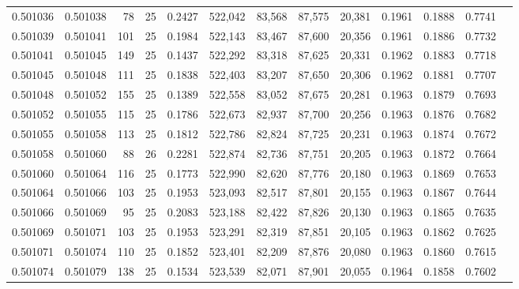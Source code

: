 \begin{tabular}{rrrrrrrrrrrrr}
0.501036 & 0.501038 &  78 &  25 &                                     0.2427 & 522,042 &  83,568 &  87,575 &  20,381 & 0.1961 & 0.1888 & 0.7741 \\
0.501039 & 0.501041 & 101 &  25 &                                     0.1984 & 522,143 &  83,467 &  87,600 &  20,356 & 0.1961 & 0.1886 & 0.7732 \\
0.501041 & 0.501045 & 149 &  25 &                                     0.1437 & 522,292 &  83,318 &  87,625 &  20,331 & 0.1962 & 0.1883 & 0.7718 \\
0.501045 & 0.501048 & 111 &  25 &                                     0.1838 & 522,403 &  83,207 &  87,650 &  20,306 & 0.1962 & 0.1881 & 0.7707 \\
0.501048 & 0.501052 & 155 &  25 &                                     0.1389 & 522,558 &  83,052 &  87,675 &  20,281 & 0.1963 & 0.1879 & 0.7693 \\
0.501052 & 0.501055 & 115 &  25 &                                     0.1786 & 522,673 &  82,937 &  87,700 &  20,256 & 0.1963 & 0.1876 & 0.7682 \\
0.501055 & 0.501058 & 113 &  25 &                                     0.1812 & 522,786 &  82,824 &  87,725 &  20,231 & 0.1963 & 0.1874 & 0.7672 \\
0.501058 & 0.501060 &  88 &  26 &                                     0.2281 & 522,874 &  82,736 &  87,751 &  20,205 & 0.1963 & 0.1872 & 0.7664 \\
0.501060 & 0.501064 & 116 &  25 &                                     0.1773 & 522,990 &  82,620 &  87,776 &  20,180 & 0.1963 & 0.1869 & 0.7653 \\
0.501064 & 0.501066 & 103 &  25 &                                     0.1953 & 523,093 &  82,517 &  87,801 &  20,155 & 0.1963 & 0.1867 & 0.7644 \\
0.501066 & 0.501069 &  95 &  25 &                                     0.2083 & 523,188 &  82,422 &  87,826 &  20,130 & 0.1963 & 0.1865 & 0.7635 \\
0.501069 & 0.501071 & 103 &  25 &                                     0.1953 & 523,291 &  82,319 &  87,851 &  20,105 & 0.1963 & 0.1862 & 0.7625 \\
0.501071 & 0.501074 & 110 &  25 &                                     0.1852 & 523,401 &  82,209 &  87,876 &  20,080 & 0.1963 & 0.1860 & 0.7615 \\
0.501074 & 0.501079 & 138 &  25 &                                     0.1534 & 523,539 &  82,071 &  87,901 &  20,055 & 0.1964 & 0.1858 & 0.7602 \\

\end{tabular}
